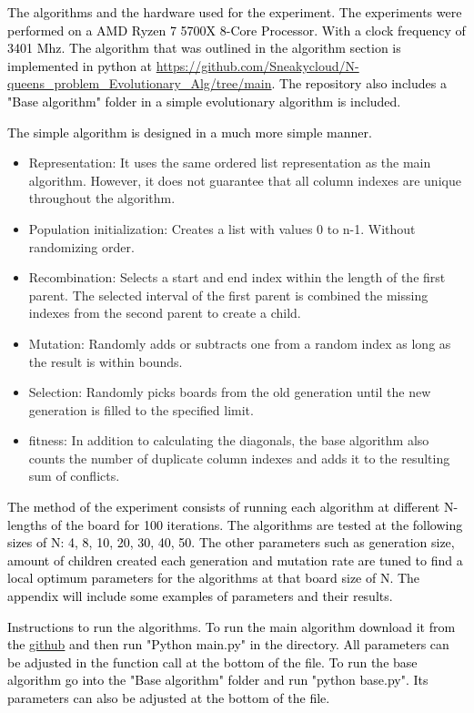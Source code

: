\documentclass{scrartcl}
\begin{document}
\textcolor{black}{The algorithms and the hardware used for the experiment. The experiments were performed on a AMD Ryzen 7 5700X 8-Core Processor. With a clock frequency of 3401 Mhz. The algorithm that was outlined in the algorithm section is implemented in python at \url{https://github.com/Sneakycloud/N-queens_problem_Evolutionary_Alg/tree/main}. The repository also includes a "Base algorithm" folder in a simple evolutionary algorithm is included.}

\textcolor{black}{\newpage The simple algorithm is designed in a much more simple manner. }
\begin{itemize}
	\item Representation: It uses the same ordered list representation as the main algorithm. However, it does not guarantee that all column indexes are unique throughout the algorithm.
	\item Population initialization:  Creates a list with values 0 to n-1. Without randomizing order.
	\item Recombination: Selects a start and end index within the length of the first parent. The selected interval of the first parent is combined the missing indexes from the second parent to create a child.
	\item Mutation: Randomly adds or subtracts one from a random index as long as the result is within bounds.
	\item Selection: Randomly picks boards from the old generation until the new generation is filled to the specified limit.
	\item fitness: In addition to calculating the diagonals, the base algorithm also counts the number of duplicate column indexes and adds it to the resulting sum of conflicts. 
\end{itemize}

\textcolor{black}{The method of the experiment consists of running each algorithm at different N-lengths of the board for 100 iterations. The algorithms are tested at the following sizes of N: 4, 8, 10, 20, 30, 40, 50. The other parameters such as generation size, amount of children created each generation and mutation rate are tuned to find a local optimum parameters for the algorithms at that board size of N.  The appendix will include some examples of parameters and their results.}

\textcolor{black}{Instructions to run the algorithms. To run the main algorithm download it from the \href{https://github.com/Sneakycloud/N-queens\_problem\_Evolutionary\_Alg/tree/main}{github} and then run "Python main.py" in the directory. All parameters can be adjusted in the function call at the bottom of the file. To run the base algorithm go into the "Base algorithm" folder and run "python base.py". Its parameters can also be adjusted at the bottom of the file.}
\end{document}
